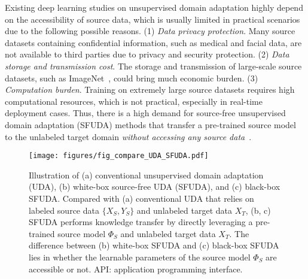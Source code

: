 \documentclass[10pt,journal,compsoc]{IEEEtran}
\begin{document}
Existing deep learning studies on unsupervised domain adaptation highly depend on the accessibility of source data, which is usually limited in practical scenarios due to the following possible reasons. 
(1) \emph{Data privacy protection}. Many source datasets containing confidential information, such as medical and facial data, are not available to third parties due to %
privacy and security protection.
(2) \emph{Data storage and transmission cost}. The storage and transmission of large-scale source datasets, such as ImageNet~\cite{deng2009imagenet}, could bring much economic burden. 
(3) \emph{Computation burden}. Training on extremely large source datasets requires high computational resources, which is not practical, especially in real-time deployment cases. 
Thus, there is a high demand for source-free unsupervised domain adaptation (SFUDA) methods that %
transfer a pre-trained source model to the unlabeled target domain \emph{without accessing any source data}~\cite{nayak2021mining, kundu2020universal, huang2021model, yang2021exploiting}. 


\begin{figure*}[!t]
    \setlength{\abovecaptionskip}{0pt}
    \setlength{\belowcaptionskip}{-2pt}
    \setlength{\abovedisplayskip}{-2pt}
    \setlength{\belowdisplayskip}{-2pt}
	\centering
	\texttt{[image: figures/fig\_compare\_UDA\_SFUDA.pdf]}
	\caption{Illustration of (a) conventional unsupervised domain adaptation (UDA), (b) white-box source-free UDA (SFUDA), and (c) black-box SFUDA. 
	Compared with (a) conventional UDA that relies on labeled source data $\{X_S, Y_S\}$ and unlabeled target data $X_T$, (b, c) SFUDA performs knowledge transfer by directly leveraging a pre-trained source model $\Phi_S$ and unlabeled target data $X_T$. The difference between (b) white-box SFUDA and (c) black-box SFUDA lies in whether the learnable parameters of the source model $\Phi_S$ are accessible or not.
	API: application programming interface.
 }
	\label{fig_compare_UDA_SFUDA}
\end{figure*}
\end{document}
